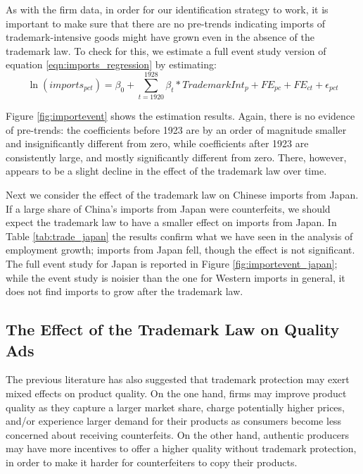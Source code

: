 \documentclass[12pt]{article}
\begin{document}
As with the firm data, in order for our identification strategy to work, it is important to make sure that there are no pre-trends indicating imports of trademark-intensive goods might have grown even in the absence of the trademark law. To check for this, we estimate a full event study version of equation  \eqref{eqn:imports_regression} by estimating:
\begin{equation} \label{eqn:imports_eventstudy}
    \ln (imports_{pct}) = \beta_0 + \sum_{t=1920}^{1928} \beta_t*TrademarkInt_{p} + FE_{pc} + FE_{ct} + \epsilon_{pct} 
\end{equation}

\noindent Figure \ref{fig:importevent} shows the estimation results. Again, there is no evidence of pre-trends: the coefficients before 1923 are by an order of magnitude smaller and insignificantly different from zero, while coefficients after 1923 are consistently large, and mostly significantly different from zero. There, however, appears to be a slight decline in the effect of the trademark law over time. 

Next we consider the effect of the trademark law on Chinese imports from Japan. If a large share of China's imports from Japan were counterfeits, we should expect the trademark law to have a smaller effect on imports from Japan. In Table \ref{tab:trade_japan} the results confirm what we have seen in the analysis of employment growth; imports from Japan fell, though the effect is not significant. The full event study for Japan is reported in Figure \ref{fig:importevent_japan}; while the event study is noisier than the one for Western imports in general, it does not find imports to grow after the trademark law.

\subsection{The Effect of the Trademark Law on Quality Ads} \label{appsec:qualityads}


The previous literature has also suggested that trademark protection may exert mixed effects on product quality. On the one hand, firms may improve product quality as they capture a larger market share, charge potentially higher prices, and/or experience larger demand for their products as consumers become less concerned about receiving counterfeits. On the other hand, authentic producers may have more incentives to offer a higher quality without trademark protection, in order to make it harder for counterfeiters to copy their products. 
\end{document}
